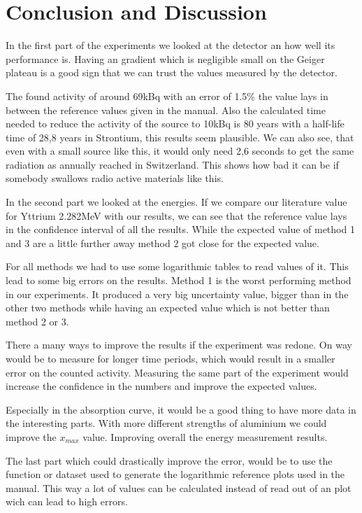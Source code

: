 \section{Conclusion and Discussion}

In the first part of the experiments we looked at the detector an how well its performance is.
Having an gradient which is negligible small on the Geiger plateau is a good sign that we can trust the values measured by the detector.


The found activity of around 69kBq with an error of 1.5\% the value lays in between the reference values given in the manual.
Also the calculated time needed to reduce the activity of the source to 10kBq is 80 years with a half-life time of 28,8 years in Strontium, this results seem plausible.
We can also see, that even with a small source like this, it would only need 2,6 seconds to get the same radiation as annually reached in Switzerland.
This shows how bad it can be if somebody swallows radio active materials like this.

In the second part we looked at the energies.
If we compare our literature value for Yttrium 2.282\si{\mega\electronvolt} with our results, we can see that the reference value lays in the confidence interval of all the results.
While the expected value of method 1 and 3 are a little further away method 2 got close for the expected value. 


For all methods we had to use some logarithmic tables to read values of it.
This lead to some big errors on the results.
Method 1 is the worst performing method in our experiments.
It produced a very big uncertainty value, bigger than in the other two methods while having an expected value which is not better than method 2 or 3.


There a many ways to improve the results if the experiment was redone.
On way would be to measure for longer time periods, which would result in a smaller error on the counted activity.
Measuring the same part of the experiment would increase the confidence in the numbers and improve the expected values.

Especially in the absorption curve, it would be a good thing to have more data in the interesting parts.
With more different strengths of aluminium we could improve the $x_{max}$ value.
Improving overall the energy measurement results.

The last part which could drastically improve the error, would be to use the function or dataset used to generate the logarithmic reference plots used in the manual.
This way a lot of values can be calculated instead of read out of an plot wich can lead to high errors.

